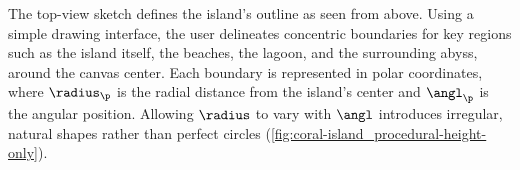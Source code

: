 





The top-view sketch defines the island's outline as seen from above. Using a simple drawing interface, the user delineates concentric boundaries for key regions such as the island itself, the beaches, the lagoon, and the surrounding abyss, around the canvas center. Each boundary is represented in polar coordinates, where $\radius_\p$ is the radial distance from the island's center and $\angl_\p$ is the angular position. Allowing $\radius$ to vary with $\angl$ introduces irregular, natural shapes rather than perfect circles (\cref{fig:coral-island_procedural-height-only}).

